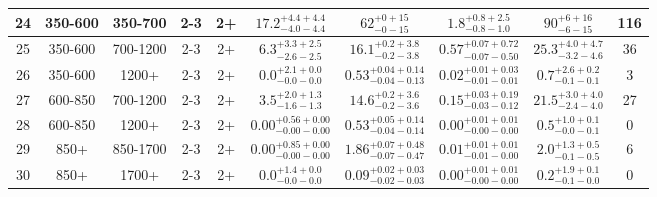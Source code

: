 \documentclass[11pt, oneside]{article}
\begin{document}
\begin{table}
{\begin{tabular}{ |c|c|c|c|c||c|c|c||c|c| }
24 & 350-600 & 350-700 & 2-3 & 2+ & $17.2^{+4.4+4.4}_{-4.0-4.4}$ & $62^{+ 0+15}_{- 0-15}$ & $1.8^{+0.8+2.5}_{-0.8-1.0}$ & $90^{+ 6+16}_{- 6-15}$ & 116 \\ \hline
25 & 350-600 & 700-1200 & 2-3 & 2+ & $6.3^{+3.3+2.5}_{-2.6-2.5}$ & $16.1^{+0.2+3.8}_{-0.2-3.8}$ & $0.57^{+0.07+0.72}_{-0.07-0.50}$ & $25.3^{+4.0+4.7}_{-3.2-4.6}$ & 36 \\ \hline
26 & 350-600 & 1200+ & 2-3 & 2+ & $0.0^{+2.1+0.0}_{-0.0-0.0}$ & $0.53^{+0.04+0.14}_{-0.04-0.13}$ & $0.02^{+0.01+0.03}_{-0.01-0.01}$ & $0.7^{+2.6+0.2}_{-0.1-0.1}$ & 3 \\ \hline
27 & 600-850 & 700-1200 & 2-3 & 2+ & $3.5^{+2.0+1.3}_{-1.6-1.3}$ & $14.6^{+0.2+3.6}_{-0.2-3.6}$ & $0.15^{+0.03+0.19}_{-0.03-0.12}$ & $21.5^{+3.0+4.0}_{-2.4-4.0}$ & 27 \\ \hline
28 & 600-850 & 1200+ & 2-3 & 2+ & $0.00^{+0.56+0.00}_{-0.00-0.00}$ & $0.53^{+0.05+0.14}_{-0.04-0.14}$ & $0.00^{+0.01+0.01}_{-0.00-0.00}$ & $0.5^{+1.0+0.1}_{-0.0-0.1}$ & 0 \\ \hline
29 & 850+ & 850-1700 & 2-3 & 2+ & $0.00^{+0.85+0.00}_{-0.00-0.00}$ & $1.86^{+0.07+0.48}_{-0.07-0.47}$ & $0.01^{+0.01+0.01}_{-0.01-0.00}$ & $2.0^{+1.3+0.5}_{-0.1-0.5}$ & 6 \\ \hline
30 & 850+ & 1700+ & 2-3 & 2+ & $0.0^{+1.4+0.0}_{-0.0-0.0}$ & $0.09^{+0.02+0.03}_{-0.02-0.03}$ & $0.00^{+0.01+0.01}_{-0.00-0.00}$ & $0.2^{+1.9+0.1}_{-0.1-0.0}$ & 0 \\ \hline
\end{tabular}}
\end{table}
\end{document}
